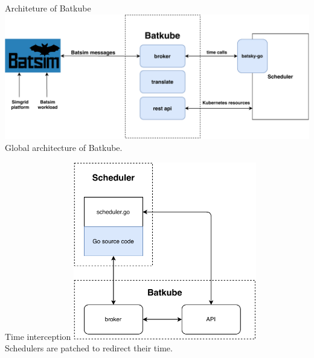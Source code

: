 \documentclass[12pt, aspectratio=43]{beamer}
\begin{document}
\begin{frame}{Architeture of Batkube}
	\centering
	\includegraphics[width=\textwidth]{../imgs/batkube-architecture-3-synchro.pdf}
	\small{Global architecture of Batkube.}
\end{frame}

%

\begin{frame}{Time interception}
	\centering
	\includegraphics[width=0.6\textwidth]{../imgs/synchro-go-sources.pdf}\\
	\small{Schedulers are patched to redirect their time.}
\end{frame}
\end{document}
